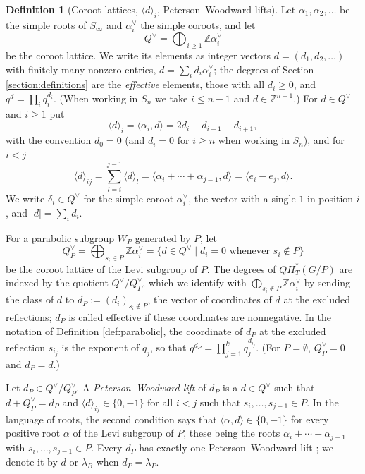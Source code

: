 \documentclass{amsart}
\theoremstyle{definition}
\newtheorem{definition}[lemma]{Definition}
\theoremstyle{remark}
\numberwithin{equation}{section}
\begin{document}
\begin{definition}[Coroot lattices, $\langle d\rangle_i$, Peterson--Woodward lifts] \label{def:pwlift}
	Let $\alpha_1,\alpha_2,\ldots$ be the simple roots of $S_\infty$ and $\alpha_i^\vee$ the simple coroots, and let
	$$Q^\vee=\bigoplus_{i\geq1}\mathbb Z\alpha_i^\vee$$
	be the coroot lattice. We write its elements as integer vectors $d=(d_1,d_2,\ldots)$ with finitely many nonzero entries, $d=\sum_id_i\alpha_i^\vee$; the degrees of Section \ref{section:definitions} are the \emph{effective} elements, those with all $d_i\geq0$, and $q^d=\prod_iq_i^{d_i}$. (When working in $S_n$ we take $i\leq n-1$ and $d\in\mathbb Z^{n-1}$.) For $d\in Q^\vee$ and $i\geq1$ put
	$$\langle d\rangle_i = \langle\alpha_i,d\rangle=2d_i - d_{i-1} - d_{i + 1},$$
	with the convention $d_0=0$ (and $d_i=0$ for $i\geq n$ when working in $S_n$), and for $i<j$
	$$\langle d\rangle_{ij} = \sum_{l=i}^{j-1}\langle d\rangle_l=\langle\alpha_i+\cdots+\alpha_{j-1},d\rangle=\langle e_i-e_j,d\rangle.$$
	We write $\delta_i\in Q^\vee$ for the simple coroot $\alpha_i^\vee$, the vector with a single $1$ in position $i$, and $|d|=\sum_id_i$.

	For a parabolic subgroup $W_P$ generated by $P$, let
	$$Q^\vee_P=\bigoplus_{s_i\in P}\mathbb Z\alpha_i^\vee=\{d\in Q^\vee\mid d_i=0\text{ whenever }s_i\notin P\}$$
	be the coroot lattice of the Levi subgroup of $P$. The degrees of $QH_T^*(G/P)$ are indexed by the quotient $Q^\vee/Q^\vee_P$, which we identify with $\bigoplus_{s_i\notin P}\mathbb Z\alpha_i^\vee$ by sending the class of $d$ to $d_P:=(d_i)_{s_i\notin P}$, the vector of coordinates of $d$ at the excluded reflections; $d_P$ is called effective if these coordinates are nonnegative. In the notation of Definition \ref{def:parabolic}, the coordinate of $d_P$ at the excluded reflection $s_{i_j}$ is the exponent of $q_j$, so that $q^{d_P}=\prod_{j=1}^kq_j^{d_{i_j}}$. (For $P=\emptyset$, $Q^\vee_P=0$ and $d_P=d$.)

	Let $d_P\in Q^\vee/Q^\vee_P$. A \emph{Peterson--Woodward lift} of $d_P$ is a $d\in Q^\vee$ such that $d+ Q_P^\vee=d_P$ and $\langle d\rangle_{ij}\in \{0,-1\}$ for all $i<j$ such that $s_{i},\ldots,s_{j-1}\in P$. In the language of roots, the second condition says that $\langle\alpha,d\rangle\in\{0,-1\}$ for every positive root $\alpha$ of the Levi subgroup of $P$, these being the roots $\alpha_i+\cdots+\alpha_{j-1}$ with $s_i,\ldots,s_{j-1}\in P$. Every $d_P$ has exactly one Peterson--Woodward lift \cite{woodward2005d}; we denote it by $d$ or $\lambda_B$ when $d_P=\lambda_P$.
 \end{definition}
\end{document}
